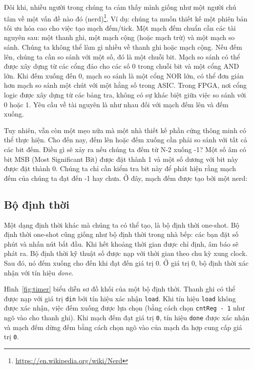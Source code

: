 \documentclass[%
    10pt,
    headinclude, footexclude,
    openright, %
    notitlepage,
    cleardoubleempty,
    headsepline,
    pointlessnumbers,
    bibtotoc, idxtotoc,
    ]{scrbook}
\newcommand{\code}[1]{{\small{\texttt{#1}}}}
\newcommand{\myref}[2]{\href{#1}{#2}}
\renewcommand{\myref}[2]{{#2}{\footnote{\url{#1}}}}
\begin{document}
Đôi khi, nhiều người trong chúng ta cảm thấy mình giống như một \myref{https://en.wikipedia.org/wiki/Nerd}{người chú tâm về một vấn đề nào đó (nerd)}.
Ví dụ: chúng ta muốn thiết kế một phiên bản tối ưu hóa cao cho việc tạo mạch đếm/tick.
Một mạch đếm chuẩn cần các tài nguyên sau: một thanh ghi, một mạch cộng (hoặc mạch trừ) và một mạch so sánh. Chúng ta không thể làm gì nhiều về thanh ghi hoặc mạch cộng. Nếu đếm lên, chúng ta cần so sánh với một số, đó là một chuỗi bit. Mạch so sánh có thể được xây dựng từ các cổng đảo cho các số 0 trong chuỗi bit và một cổng AND lớn.
Khi đếm xuống đến 0, mạch so sánh là một cổng NOR lớn, có thể đơn giản hơn mạch so sánh một chút với một hằng số trong ASIC.
Trong FPGA, nơi cổng logic được xây dựng từ các bảng tra, không có sự khác biệt giữa việc so sánh với 0 hoặc 1. Yêu cầu về tài nguyên là như nhau đối với mạch đếm lên và đếm xuống.

Tuy nhiên, vẫn còn một mẹo nữa mà một nhà thiết kế phần cứng thông minh có thể thực hiện.
Cho đến nay, đếm lên hoặc đếm xuống cần phải so sánh với tất cả các bit đếm.
Điều gì sẽ xảy ra nếu chúng ta đếm từ N-2 xuống -1? Một số âm có bit MSB (Most Significant Bit) được đặt thành 1 và một số dương với bit này được đặt thành 0. Chúng ta chỉ cần kiểm tra bit này để phát hiện rằng mạch đếm của chúng ta đạt đến -1 hay chưa. Ở đây, mạch đếm được tạo bởi một nerd: 



\subsection{Bộ định thời}

Một dạng định thời khác mà chúng ta có thể tạo, là bộ định thời one-shot. Bộ định thời one-shot cũng giống như bộ định thời trong nhà bếp: các bạn đặt số phút và nhấn nút bắt đầu. Khi hết khoảng thời gian được chỉ định, âm báo sẽ phát ra.
Bộ định thời kỹ thuật số được nạp với thời gian theo chu kỳ xung clock.
Sau đó, nó đếm xuống cho đến khi đạt đến giá trị 0. Ở giá trị 0, bộ định thời xác nhận với tín hiệu \emph{done}. 

Hình~\ref{fig:timer} biểu diễn sơ đồ khối của một bộ định thời. Thanh ghi có thể được nạp với
giá trị \code{din} bởi tín hiệu xác nhận \code{load}. Khi tín hiệu \code{load} không được xác nhận,
việc đếm xuống được lựa chọn (bằng cách chọn \code{cntReg - 1} như ngõ vào cho thanh ghi).
Khi mạch đếm đạt giá trị \code{0}, tín hiệu \code{done} được xác nhận và mạch đếm dừng đếm
bằng cách chọn ngõ vào của mạch đa hợp cung cấp giá trị \code{0}.
\end{document}
